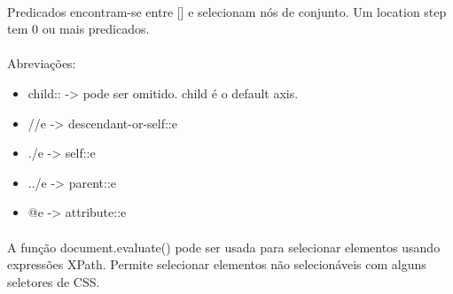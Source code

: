 \documentclass[../resumosLTW.tex]{subfiles}
\begin{document}
\paragraph{}

Predicados encontram-se entre [] e selecionam nós de conjunto. 
Um location step tem 0 ou mais predicados.

\paragraph{}

Abreviações:
\begin{itemize}
    \item child:: -> pode ser omitido. child é o default axis.
    \item //e -> descendant-or-self::e
    \item ./e -> self::e
    \item ../e -> parent::e
    \item @e -> attribute::e
\end{itemize}

\paragraph{}

A função document.evaluate() pode ser usada para selecionar elementos usando expressões XPath.
Permite selecionar elementos não selecionáveis com alguns seletores de CSS.
\end{document}
